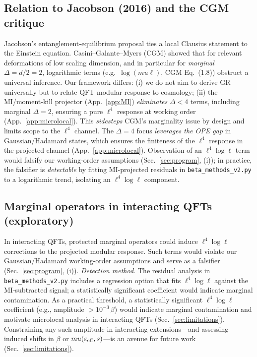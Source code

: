 \documentclass[aps,prd,onecolumn,superscriptaddress,nofootinbib]{revtex4-2}
\def\mu{mu}%
\begin{document}
\subsection{Relation to Jacobson (2016) and the CGM critique}
Jacobson’s entanglement-equilibrium proposal \cite{Jacobson2016} ties a local Clausius statement to the Einstein equation. Casini–Galante–Myers (CGM) \cite{CasiniGalanteMyers2016} showed that for relevant deformations of low scaling dimension, and in particular for \emph{marginal} \(\Delta=d/2=2\), logarithmic terms (e.g.\ \(\log(\mu\ell)\), CGM Eq.~(1.8)) obstruct a universal inference. Our framework differs: (i) we do not aim to derive GR universally but to relate QFT modular response to cosmology; (ii) the MI/moment-kill projector (App.~\ref{app:MI}) \emph{eliminates} \(\Delta<4\) terms, including marginal \(\Delta=2\), ensuring a pure \(\ell^4\) response at working order (App.~\ref{app:microlocal}). This \emph{sidesteps} CGM’s marginality issue by design and limits scope to the \(\ell^4\) channel. The \(\Delta=4\) focus \emph{leverages the OPE gap} in Gaussian/Hadamard states, which ensures the finiteness of the \(\ell^4\) response in the projected channel (App.~\ref{app:microlocal}). Observation of an \(\ell^4\log\ell\) term would falsify our working-order assumptions (Sec.~\ref{sec:program}, (i)); in practice, the falsifier is \emph{detectable} by fitting MI-projected residuals in \texttt{beta\_methods\_v2.py} to a logarithmic trend, isolating an \(\ell^4\log\ell\) component.

\subsection{Marginal operators in interacting QFTs (exploratory)}
In interacting QFTs, protected marginal operators could induce \(\ell^4\log\ell\) corrections to the projected modular response. Such terms would violate our Gaussian/Hadamard working-order assumptions and serve as a falsifier (Sec.~\ref{sec:program}, (i)). \emph{Detection method.} The residual analysis in \texttt{beta\_methods\_v2.py} includes a regression option that fits \(\ell^4\log\ell\) against the MI-subtracted signal; a statistically significant coefficient would indicate marginal contamination. As a practical threshold, a statistically significant \(\ell^4\log\ell\) coefficient (e.g., amplitude \(>10^{-3}\,\beta\)) would indicate marginal contamination and motivate microlocal analysis in interacting QFTs (Sec.~\ref{sec:limitations}). Constraining any such amplitude in interacting extensions—and assessing induced shifts in \(\beta\) or \(\mu(\varepsilon_{\rm eff},s)\)—is an avenue for future work (Sec.~\ref{sec:limitations}).
\end{document}
